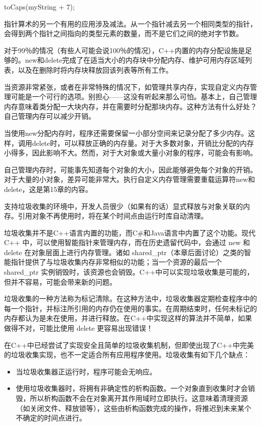 \begin{cpp}
toCaps(myString + 7);
\end{cpp}

指针算术的另一个有用的应用涉及减法。从一个指针减去另一个相同类型的指针，会得到两个指针之间指向的类型元素的数量，而不是它们之间的绝对字节数。


对于99％的情况（有些人可能会说100％的情况），C++内置的内存分配设施是足够的。new和delete完成了在适当大小的内存块中分配内存、维护可用内存区域列表，以及在删除时将内存块释放回该列表等所有工作。

当资源非常紧张，或者在非常特殊的情况下，如管理共享内存，实现自定义内存管理可能是一个可行的选项。别担心——这没有听起来那么可怕。基本上，自己管理内存意味着类分配一大块内存，并在需要时分配那块内存。这种方法有什么好处？自己管理内存可以减少开销。

当使用new分配内存时，程序还需要保留一小部分空间来记录分配了多少内存。这样，调用delete时，可以释放正确的内存量。对于大多数对象，开销比分配的内存小得多，因此影响不大。然而，对于大对象或大量小对象的程序，可能会有影响。

自己管理内存时，可能事先知道每个对象的大小，因此能够避免每个对象的开销。对于大量的小对象，差异可能非常大。执行自定义内存管理需要重载运算符new和delete，这是第15章的内容。


支持垃圾收集的环境中，开发人员很少（如果有的话）显式释放与对象关联的内存。引用对象不再使用时，将在某个时间点由运行时库自动清理。

垃圾收集并不是C++语言内置的功能，而C\#和Java语言中内置了这个功能。现代C++ 中，可以使用智能指针来管理内存，而在历史遗留代码中，会通过 new 和 delete 在对象层面上进行内存管理。诸如 shared\_ptr（本章后面讨论）之类的智能指针提供了与垃圾收集内存非常相似的功能；当一个资源的最后一个 shared\_ptr 实例销毁时，该资源也会销毁。C++中可以实现垃圾收集是可能的，但并不容易，可能会带来新的问题。

垃圾收集的一种方法称为标记清除。在这种方法中，垃圾收集器定期检查程序中的每一个指针，并标注所引用的内存仍在使用的事实。在周期结束时，任何未标记的内存都认为是未在使用，并进行释放。在C++中实现这样的算法并不简单，如果做得不对，可能比使用 delete 更容易出现错误！

在C++中已经尝试了实现安全且简单的垃圾收集机制，但即使出现了C++中完美的垃圾收集实现，也不一定适合所有应用程序使用。垃圾收集有如下几个缺点：

\begin{itemize}
\item
当垃圾收集器正运行时，程序可能会无响应。

\item
使用垃圾收集器时，将拥有非确定性的析构函数。一个对象直到收集时才会销毁，所以析构函数不会在对象离开其作用域时立即执行。这意味着清理资源（如关闭文件、释放锁等），这些由析构函数完成的操作，将推迟到未来某个不确定的时间点进行。
\end{itemize}

